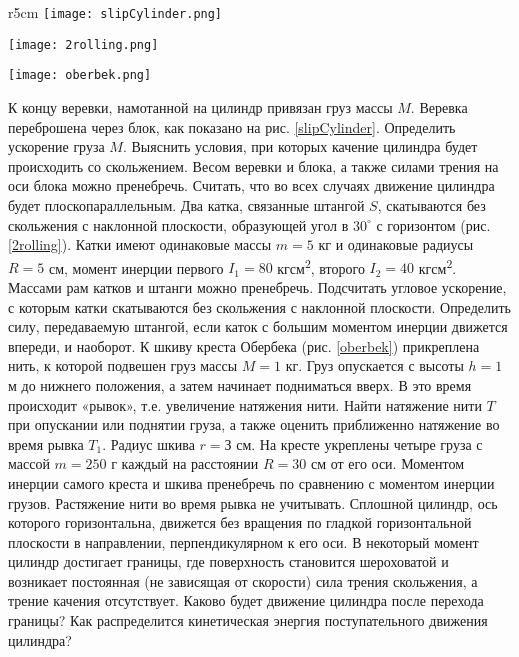 \begin{wrapfigure}[30]{r}{5cm}
\texttt{[image: slipCylinder.png]}
\caption{}
\label{slipCylinder}
\texttt{[image: 2rolling.png]}
\caption{}
\label{2rolling}
\centering
\texttt{[image: oberbek.png]}
\caption{}
\label{oberbek}
\end{wrapfigure}
\AddProb К концу веревки, намотанной на цилиндр привязан груз массы $M$. Веревка переброшена через блок, как показано на рис. \ref{slipCylinder}. Определить ускорение груза $M$. Выяснить условия, при которых качение цилиндра будет происходить со скольжением. Весом веревки и блока, а также силами трения на оси блока можно пренебречь. Считать, что во всех случаях движение цилиндра будет плоскопараллельным.
\AddProb Два катка, связанные штангой $S$, скатываются без скольжения с наклонной плоскости, образующей угол в $30^{\circ}$ с горизонтом (рис. \ref{2rolling}). Катки имеют одинаковые массы $m = 5$ кг и одинаковые радиусы $R = 5$ см, момент инерции первого $I_1 = 80$ кгсм\textsuperscript{2}, второго $I_2 = 40$ кгсм\textsuperscript{2}. Массами рам катков и штанги можно пренебречь. Подсчитать угловое ускорение, с которым катки скатываются без скольжения с наклонной плоскости. Определить силу, передаваемую штангой, если каток с большим моментом инерции движется впереди, и наоборот.
\AddProb К шкиву креста Обербека (рис. \ref{oberbek}) прикреплена нить, к которой подвешен груз массы $M = 1$ кг. Груз опускается с высоты $h = 1$ м до нижнего положения, а затем начинает подниматься вверх. В это время происходит «рывок», т.е. увеличение натяжения нити. Найти натяжение нити $T$ при опускании или поднятии груза, а также оценить приближенно натяжение во время рывка $T_1$. Радиус шкива $r = З$ см. На кресте укреплены четыре груза с массой $m = 250$ г каждый на расстоянии $R = 30$ см от его оси. Моментом инерции самого креста и шкива пренебречь по сравнению с моментом инерции грузов. Растяжение нити во время рывка не учитывать.
\AddProb Сплошной цилиндр, ось которого горизонтальна, движется без вращения по гладкой горизонтальной плоскости в направлении,
перпендикулярном к его оси. В некоторый момент цилиндр достигает
границы, где поверхность становится шероховатой и возникает постоянная (не зависящая от скорости) сила трения скольжения, а трение качения отсутствует. Каково будет движение цилиндра после перехода границы? Как распределится кинетическая энергия поступательного движения цилиндра?
\clearpage
